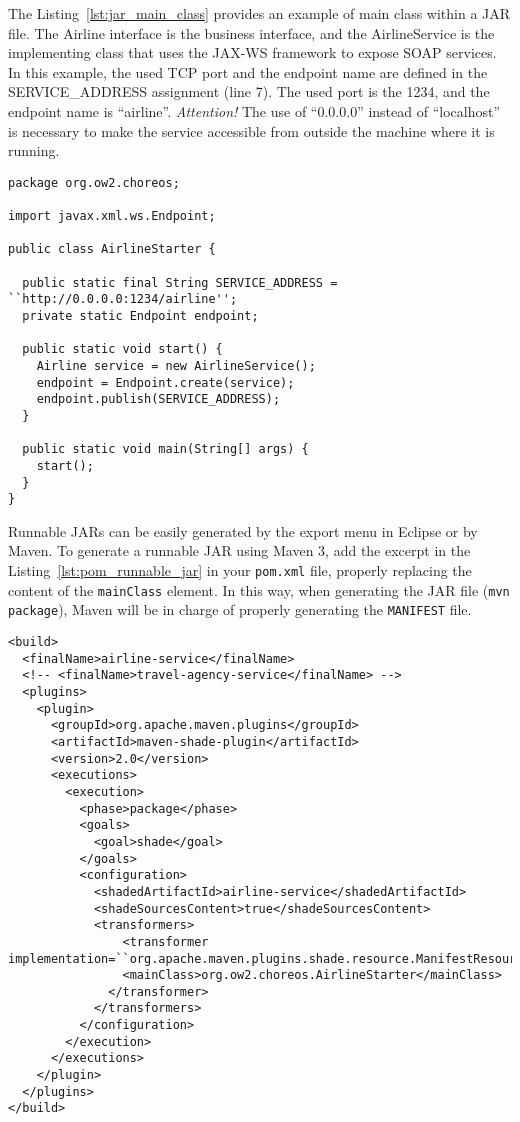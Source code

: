 The Listing~\ref{lst:jar_main_class} provides an example of main class within a JAR file. The \textsf{Airline} interface is the business interface, and the \textsf{AirlineService} is the implementing class that uses the JAX-WS framework to expose SOAP services. In this example, the used TCP port and the endpoint name are defined in the SERVICE\_ADDRESS assignment (line 7). The used port is the 1234, and the endpoint name is ``airline''. \emph{Attention!} The use of ``0.0.0.0'' instead of ``localhost'' is necessary to make the service accessible from outside the machine where it is running. 


\lstset{
language=Java,
numbers=left
}

{\footnotesize
\begin{lstlisting}[caption=Example of a class with the main method within a JAR file, label=lst:jar_main_class]
package org.ow2.choreos;

import javax.xml.ws.Endpoint;

public class AirlineStarter {

  public static final String SERVICE_ADDRESS = ``http://0.0.0.0:1234/airline'';
  private static Endpoint endpoint;
	
  public static void start() {
    Airline service = new AirlineService();
    endpoint = Endpoint.create(service);
    endpoint.publish(SERVICE_ADDRESS);
  }

  public static void main(String[] args) {	
    start();
  }
}
\end{lstlisting}
}

Runnable JARs can be easily generated by the export menu in Eclipse or by Maven. To generate a runnable JAR using Maven 3, add the excerpt in the Listing~\ref{lst:pom_runnable_jar} in your \texttt{pom.xml} file, properly replacing the content of the \texttt{mainClass} element. In this way, when generating the JAR file (\texttt{mvn package}), Maven will be in charge of properly generating the \texttt{MANIFEST} file.

\lstset{
language=XML
}

{\footnotesize
\begin{lstlisting}[caption=Excerpt of pom file to generate a runnable JAR using Maven 3, label=lst:pom_runnable_jar]
<build>
  <finalName>airline-service</finalName> 
  <!-- <finalName>travel-agency-service</finalName> -->
  <plugins>
    <plugin>
      <groupId>org.apache.maven.plugins</groupId>
      <artifactId>maven-shade-plugin</artifactId>
      <version>2.0</version>
      <executions>
        <execution>
          <phase>package</phase>
          <goals>
            <goal>shade</goal>
          </goals>
          <configuration>
            <shadedArtifactId>airline-service</shadedArtifactId>
            <shadeSourcesContent>true</shadeSourcesContent>
            <transformers>
                <transformer 
implementation=``org.apache.maven.plugins.shade.resource.ManifestResourceTransformer''>
                <mainClass>org.ow2.choreos.AirlineStarter</mainClass>
              </transformer>
            </transformers>
          </configuration>
        </execution>
      </executions>
    </plugin>
  </plugins>
</build>
\end{lstlisting}
}


